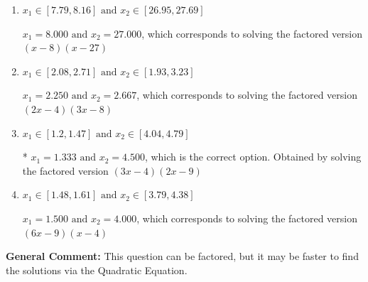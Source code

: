 \documentclass{extbook}[14pt]
\begin{document}
\begin{enumerate}
{\begin{enumerate}[label=\Alph*.]
$x_1 = 0.444 \text{ and } x_2 = 13.500$, which corresponds to solving the factored version $(3x -1)(2x -27)$
\item \( x_1 \in [7.79, 8.16] \text{ and } x_2 \in [26.95, 27.69] \)

$x_1 = 8.000 \text{ and } x_2 = 27.000$, which corresponds to solving the factored version $(x -8)(x -27)$
\item \( x_1 \in [2.08, 2.71] \text{ and } x_2 \in [1.93, 3.23] \)

$x_1 = 2.250 \text{ and } x_2 = 2.667$, which corresponds to solving the factored version $(2x -4)(3x -8)$
\item \( x_1 \in [1.2, 1.47] \text{ and } x_2 \in [4.04, 4.79] \)

* $x_1 = 1.333 \text{ and } x_2 = 4.500$, which is the correct option. Obtained by solving the factored version $(3x -4)(2x -9)$
\item \( x_1 \in [1.48, 1.61] \text{ and } x_2 \in [3.79, 4.38] \)

$x_1 = 1.500 \text{ and } x_2 = 4.000$, which corresponds to solving the factored version $(6x -9)(x -4)$
\end{enumerate}

\textbf{General Comment:} This question can be factored, but it may be faster to find the solutions via the Quadratic Equation.
}
\end{enumerate}
\end{document}
